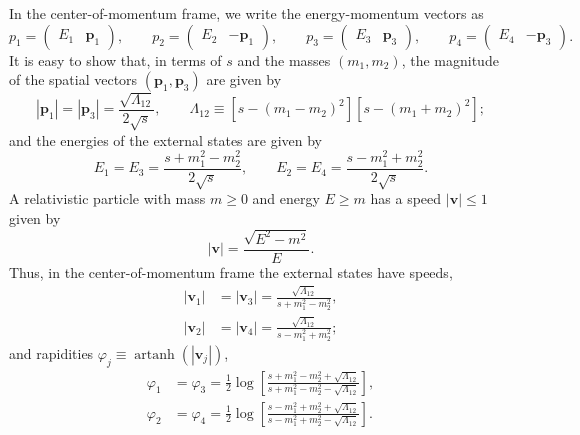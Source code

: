 In the center-of-momentum frame, we write the energy-momentum vectors as
\begin{equation}
	p_{1} = \begin{pmatrix} E_{1} & \mathbf{p}_{1} \end{pmatrix}, \qquad p_{2} = \begin{pmatrix} E_{2} & -\mathbf{p}_{1} \end{pmatrix}, \qquad p_{3} = \begin{pmatrix} E_{3} & \mathbf{p}_{3} \end{pmatrix}, \qquad p_{4} = \begin{pmatrix} E_{4} & -\mathbf{p}_{3} \end{pmatrix}.
\end{equation}
It is easy to show that, in terms of $s$ and the masses $(m_{1}, m_{2})$, the magnitude of the spatial vectors $(\mathbf{p}_{1}, \mathbf{p}_{3})$ are given by
\begin{equation}
	|\mathbf{p}_{1}| = |\mathbf{p}_{3}| = \frac{\sqrt{\Lambda_{12}}}{2 \sqrt{s}}, \qquad \Lambda_{12} \equiv \left[s - \left(m_{1} - m_{2} \right)^{2} \right] \left[s - \left(m_{1} + m_{2}\right)^{2} \right];
	\label{2Momenta}
\end{equation}
and the energies of the external states are given by
\begin{equation}
	E_{1} = E_{3} = \frac{s + m_{1}^{2} - m_{2}^{2}}{2 \sqrt{s}}, \qquad E_{2} = E_{4} = \frac{s - m_{1}^{2} + m_{2}^{2}}{2 \sqrt{s}}.
	\label{4Energies}
\end{equation}
A relativistic particle with mass $m \geq 0$ and energy $E \geq m$ has a speed $|\mathbf{v}| \leq 1$ given by
\begin{equation}
	|\mathbf{v}| = \frac{\sqrt{E^{2} - m^{2}}}{E}.
\end{equation}
Thus, in the center-of-momentum frame the external states have speeds,
\begin{equation}
\begin{split}
	|\mathbf{v}_{1}| &= |\mathbf{v}_{3}| = \frac{\sqrt{\Lambda_{12}}}{s + m_{1}^{2} - m_{2}^{2}}, \\
	|\mathbf{v}_{2}| &= |\mathbf{v}_{4}| = \frac{\sqrt{\Lambda_{12}}}{s - m_{1}^{2} + m_{2}^{2}};
\end{split} \label{4Speeds}
\end{equation}
and rapidities $\varphi_{j} \equiv \operatorname{artanh}{(|\mathbf{v}_{j}|)}$,
\begin{equation}
\begin{split}
	\varphi_{1} &= \varphi_{3} = \frac{1}{2} \log{\left[ \frac{s + m_{1}^{2} - m_{2}^{2} + \sqrt{\Lambda_{12}}}{s + m_{1}^{2} - m_{2}^{2} - \sqrt{\Lambda_{12}}} \right]}, \\
	\varphi_{2} &= \varphi_{4} = \frac{1}{2} \log{\left[ \frac{s - m_{1}^{2} + m_{2}^{2} + \sqrt{\Lambda_{12}}}{s - m_{1}^{2} + m_{2}^{2} - \sqrt{\Lambda_{12}}} \right]}.
\end{split} \label{4Rapidities}
\end{equation}
